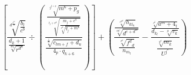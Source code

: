 \documentclass[8pt,a4paper]{beamer}
\author{Vaczula Tamás}
\begin{document}
$$\left[ \frac{\sqrt[d^{\frac{4^m}{3}}]{\frac{b_l}{c^b}}}{\frac{d_k + 1}{\sqrt[m_l]{r^{d^n}}}} 
\div \left( 
\frac{\frac{\sqrt[g^{4+p}]{m^6+p_g}}{\sqrt[t_j+c^p]{\frac{m_j+c^4}{\sqrt[p^b]{q_j+m^b}}}}}{\frac{\sqrt[\frac{t}{m}]{c_{lm+f}+d_u}}{4_p\cdot q_{k+6}}} \right) 
\right] 
+ 
\left( \frac{\frac{\sqrt[c^{p^q}]{h_{kl_{n}}}}{\sqrt[m^i]{d^{c+d^m}}}}
{\frac{\sqrt[c^p]{f^d \phantom{}_d}}{n_{m_l}}}
-
\frac{\frac{\sqrt[c^6]{a^m+4_t}}{d_{k_l}-\sqrt[p]{v_k}}}{\frac{\sqrt[g^4]{m_k}}{U^{j^s}}}
\right)$$
\end{document}
